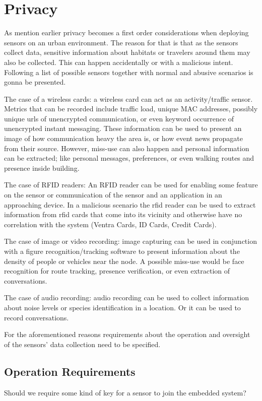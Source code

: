 \section{Privacy}

As mention earlier privacy becomes a first order considerations when deploying sensors on an urban environment. The reason for that is that as the sensors collect data, sensitive information about habitats or travelers around them may also be collected. This can happen accidentally or with a malicious intent. Following a list of possible sensors together with normal and abusive scenarios is gonna be presented.

The case of a wireless cards: a wireless card can act as an activity/traffic sensor. Metrics that can be recorded include traffic load, unique MAC addresses, possibly unique urls of unencrypted communication, or even keyword occurrence of unencrypted instant messaging. These information can be used to present an image of how communication heavy the area is, or how event news propagate from their source. However, miss-use can also happen and personal information can be extracted; like personal messages, preferences, or even walking routes and presence inside building.
  
The case of RFID readers: An RFID reader can be used for enabling some feature on the sensor or communication of the sensor and an application in an approaching device. In a malicious scenario the rfid reader can be used to extract information from rfid cards that come into its vicinity and otherwise have no correlation with the system (Ventra Cards, ID Cards, Credit Cards).
  
The case of image or video recording: image capturing can be used in conjunction with a figure recognition/tracking software to present information about the density of people or vehicles near the node. A possible miss-use would be face recognition for route tracking, presence verification, or even extraction of conversations.
  
The case of audio recording: audio recording can be used to collect information about noise levels or species identification in a location. Or it can be used to record conversations.
  
  
For the aforementioned reasons requirements about the operation and oversight of the sensors' data collection need to be specified.

\subsection{Operation Requirements}
Should we require some kind of key for a sensor to join the embedded system?


